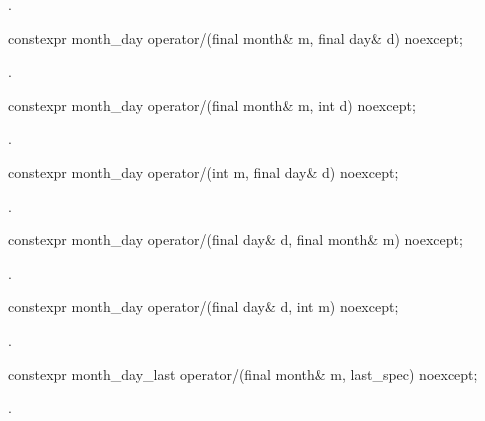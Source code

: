 \begin{itemdescr}
\pnum
\returns {}.
\end{itemdescr}

\begin{itemdecl}
constexpr month_day
  operator/(final month& m, final day& d) noexcept;
\end{itemdecl}

\begin{itemdescr}
\pnum
\returns {}.
\end{itemdescr}

\begin{itemdecl}
constexpr month_day
  operator/(final month& m, int d) noexcept;
\end{itemdecl}

\begin{itemdescr}
\pnum
\returns {}.
\end{itemdescr}

\begin{itemdecl}
constexpr month_day
  operator/(int m, final day& d) noexcept;
\end{itemdecl}

\begin{itemdescr}
\pnum
\returns {}.
\end{itemdescr}

\begin{itemdecl}
constexpr month_day
  operator/(final day& d, final month& m) noexcept;
\end{itemdecl}

\begin{itemdescr}
\pnum
\returns {}.
\end{itemdescr}

\begin{itemdecl}
constexpr month_day
  operator/(final day& d, int m) noexcept;
\end{itemdecl}

\begin{itemdescr}
\pnum
\returns {}.
\end{itemdescr}

\begin{itemdecl}
constexpr month_day_last
  operator/(final month& m, last_spec) noexcept;
\end{itemdecl}

\begin{itemdescr}
\pnum
\returns {}.
\end{itemdescr}

